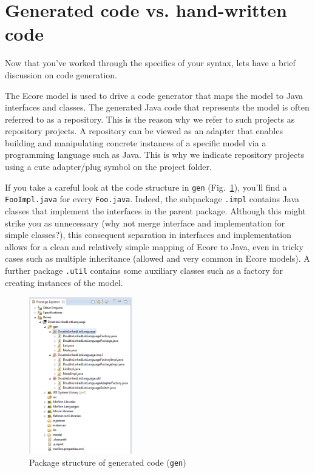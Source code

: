 \newpage
\genHeader
\hypertarget{codeGen common}{} 
\section{Generated code vs. hand-written code}

Now that you've worked through the specifics of your syntax, lets have a brief discussion on code generation.

The Ecore model is used to drive a code generator that maps the model to Java interfaces and classes. The generated Java code that represents the model is often
referred to as a repository. This is the reason why we refer to such projects as repository projects. A repository can be viewed as an adapter that enables
building and manipulating concrete instances of a specific model via a programming language such as Java. This is why we indicate repository projects using a
cute adapter/plug symbol on the project folder.

If you take a careful look at the code structure in \texttt{gen} (Fig.~\ref{eclipse:structureGen}), you'll find a \texttt{FooImpl.java} for every
\texttt{Foo.java}. Indeed, the subpackage \texttt{.impl} contains Java classes that implement the interfaces in the parent package. Although this might strike
you as unnecessary (why not merge interface and implementation for simple classes?), this consequent separation in interfaces and implementation allows for a
clean and relatively simple mapping of Ecore to Java, even in tricky cases such as multiple inheritance (allowed and very common in Ecore models). A further
package \texttt{.util} contains some auxiliary classes such as a factory for creating instances of the model.

 \begin{figure}[htbp]
  \centering
  \includegraphics[width=0.4\textwidth]{eclipse_structureGen}
  \caption{Package structure of generated code (\texttt{gen})}
  \label{eclipse:structureGen}
\end{figure}

